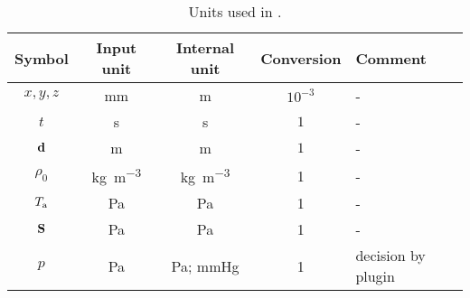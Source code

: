 \begin{table}[h!]
    \centering
    \caption{Units used in \CM.}
    \label{tab:units}
    \begin{tabular}{ccccl}
        \toprule
        Symbol  & Input unit & Internal unit & Conversion & Comment \\
        \midrule
         $x,y,z$ & \si{mm} & \si{m} & $10^{-3}$ & -\\
         $t$ & \si{s} & \si{s} & $1$ & -\\
         $\d$ & \si{m} & \si{m} & $1$ & -\\
         $\rho_0$ & \si{\kilo\gram\per\meter\cubed} & \si{\kilo\gram\per\meter\cubed} & 1 & -\\
         $T_\mathrm{a}$ & \si{\pascal} & \si{\pascal} & 1 & -\\
         $\S$ & \si{\pascal} & \si{\pascal} & 1 & -\\
         $p$ & \si{\pascal} & \si{\pascal}; \si{mmHg} & 1 & decision by plugin\\
         \bottomrule
    \end{tabular}
\end{table}

